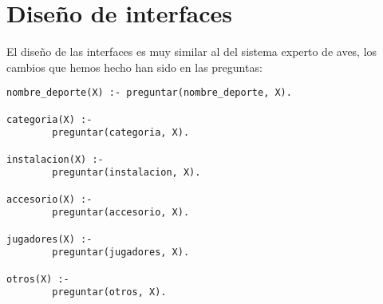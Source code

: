 \chapter{Diseño de interfaces}
El diseño de las interfaces es muy similar al del sistema experto de aves, los cambios que hemos hecho han sido en las preguntas:

\begin{verbatim}
nombre_deporte(X) :- preguntar(nombre_deporte, X).

categoria(X) :-
        preguntar(categoria, X).

instalacion(X) :-
        preguntar(instalacion, X).

accesorio(X) :-
        preguntar(accesorio, X).

jugadores(X) :-
        preguntar(jugadores, X).

otros(X) :-
        preguntar(otros, X).
\end{verbatim}
